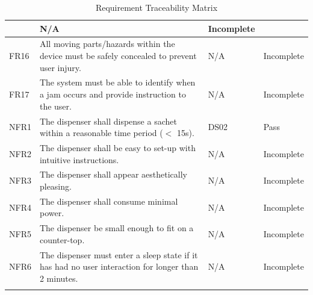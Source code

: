 \documentclass[12pt]{article}
\begin{document}
\begin{longtable}{|p{}|p{}|p{}|p{}|}
&  N/A & Incomplete         \\ \hline
FR16   & All moving parts/hazards within the device must be safely concealed to prevent user injury. 
&  N/A & Incomplete         \\ \hline
FR17   & The system must be able to identify when a jam occurs and provide instruction to the user. 
&  N/A & Incomplete         \\ \hline
NFR1   & The dispenser shall dispense a sachet within a reasonable time period ($<$ 15s). 
& DS02 & Pass \\ \hline
NFR2   & The dispenser shall be easy to set-up with intuitive instructions. 
&  N/A & Incomplete         \\ \hline
NFR3   & The dispenser shall appear aesthetically pleasing. 
&  N/A & Incomplete         \\ \hline
NFR4   & The dispenser shall consume minimal power. 
&  N/A & Incomplete         \\ \hline
NFR5   & The dispenser be small enough to fit on a counter-top. 
&  N/A & Incomplete         \\ \hline
NFR6   & The dispenser must enter a sleep state if it has had no user interaction for longer than 2 minutes. 
&   N/A & Incomplete         \\ \hline
\caption{Requirement Traceability Matrix} %
\end{longtable}
\end{document}
